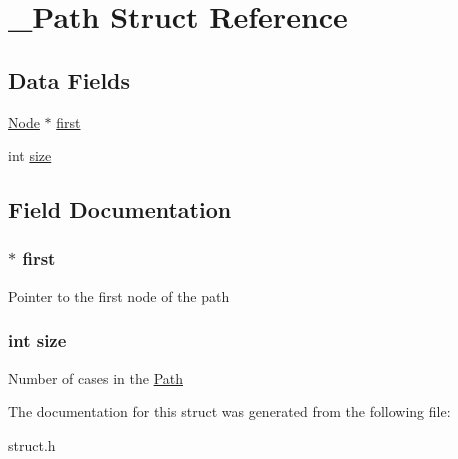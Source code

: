\hypertarget{struct___path}{}\section{\+\_\+\+Path Struct Reference}
\label{struct___path}
\subsection*{Data Fields}
\begin{DoxyCompactItemize}
\item 
\hyperlink{struct___node}{Node} $\ast$ \hyperlink{struct___path_a2addc5f5fab651284199528b83cd61c8}{first}
\item 
int \hyperlink{struct___path_a439227feff9d7f55384e8780cfc2eb82}{size}
\end{DoxyCompactItemize}


\subsection{Field Documentation}
\subsubsection[{\texorpdfstring{first}{first}}]{$\ast$ first}\hypertarget{struct___path_a2addc5f5fab651284199528b83cd61c8}{}\label{struct___path_a2addc5f5fab651284199528b83cd61c8}
Pointer to the first node of the path 
\subsubsection[{\texorpdfstring{size}{size}}]{\setlength{\rightskip}{0pt plus 5cm}int size}\hypertarget{struct___path_a439227feff9d7f55384e8780cfc2eb82}{}\label{struct___path_a439227feff9d7f55384e8780cfc2eb82}
Number of cases in the \hyperlink{struct_path}{Path} 

The documentation for this struct was generated from the following file\+:\begin{DoxyCompactItemize}
\item 
struct.\+h\end{DoxyCompactItemize}
